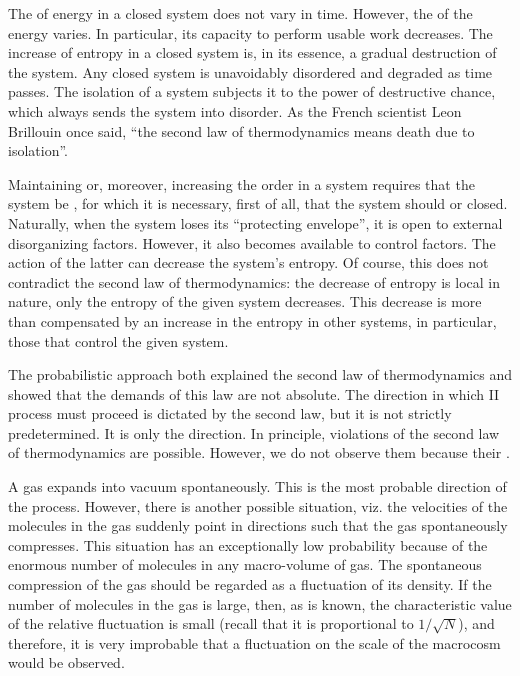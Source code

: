 The  of energy in a closed system does not vary in time. However, the  of the energy varies. In particular, its capacity to perform usable work decreases. The increase of entropy in a closed system is, in its essence, a gradual destruction of the system. Any closed system is unavoidably disordered and degraded as time passes. The isolation of a system subjects it to the power of destructive chance, which always sends the system into disorder. As the French scientist Leon Brillouin once said, ``the second law of thermodynamics means death due to isolation''. 

Maintaining or, moreover, increasing the order in a system requires
that the system be , for which it is necessary, first of all, that the system should  or closed. Naturally, when the system loses its ``protecting envelope'', it is open to external disorganizing factors. However, it also becomes available to control factors. The action of the latter can decrease the system's entropy. Of course, this does not contradict the second law of thermodynamics: the decrease of entropy is local in nature, only the entropy of the given system decreases. This decrease is more than compensated by an increase in the entropy in other systems, in particular, those that control the given system.

 The probabilistic approach both explained the second law of thermodynamics and showed that the demands of this law are not absolute. The direction in which II process must proceed is dictated by the second law, but it is not strictly predetermined. It is only the  direction. In principle, violations of the second law of thermodynamics are possible. However, we do not observe them because their .

A gas expands into vacuum spontaneously. This is the most probable direction of the process. However, there is another possible situation, viz. the velocities of the molecules in the gas suddenly point in directions such that the gas spontaneously compresses. This situation has an exceptionally low probability because of the enormous number of molecules in any macro-volume of gas. The spontaneous compression of the gas should be regarded as a fluctuation of its density. If the number of molecules in the gas is large, then, as is known, the characteristic value of the relative fluctuation is small (recall that it is proportional to $1 / \sqrt{N}$), and therefore, it is very improbable that a fluctuation on the scale of the macrocosm would be observed.


